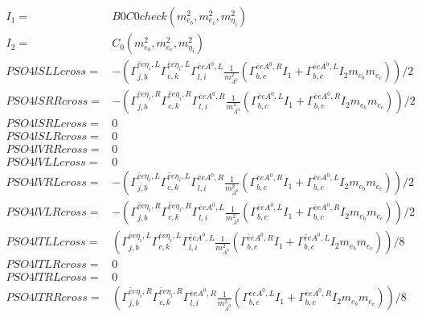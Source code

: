 \documentclass[A4,landscape]{article}
\begin{document}
\begin{align} 
I_1= & B0C0check(m^2_{e_{{b}}}, m^2_{e_{{c}}}, m^2_{\eta_i}) \\ 
I_2= & C_0(m^2_{e_{{b}}}, m^2_{e_{{c}}}, m^2_{\eta_i}) \\ 
  PSO4lSLLcross= & -( \Gamma^{\bar{e}e \eta_i ,L}_{j, b} \Gamma^{\bar{e}e \eta_i ,L}_{c, k} \Gamma^{\bar{e}e A^0 ,L}_{l, i} \frac{1}{m^2_{A^0}} (\Gamma^{\bar{e}e A^0 ,R}_{b, c} I_1 + \Gamma^{\bar{e}e A^0 ,L}_{b, c} I_2 m_{e_{{b}}} m_{e_{{c}}}))/2 \\ 
  PSO4lSRRcross= & -( \Gamma^{\bar{e}e \eta_i ,R}_{j, b} \Gamma^{\bar{e}e \eta_i ,R}_{c, k} \Gamma^{\bar{e}e A^0 ,R}_{l, i} \frac{1}{m^2_{A^0}} (\Gamma^{\bar{e}e A^0 ,L}_{b, c} I_1 + \Gamma^{\bar{e}e A^0 ,R}_{b, c} I_2 m_{e_{{b}}} m_{e_{{c}}}))/2 \\ 
  PSO4lSRLcross= & 0 \\ 
  PSO4lSLRcross= & 0 \\ 
  PSO4lVRRcross= & 0 \\ 
  PSO4lVLLcross= & 0 \\ 
  PSO4lVRLcross= & -( \Gamma^{\bar{e}e \eta_i ,L}_{j, b} \Gamma^{\bar{e}e \eta_i ,L}_{c, k} \Gamma^{\bar{e}e A^0 ,R}_{l, i} \frac{1}{m^2_{A^0}} (\Gamma^{\bar{e}e A^0 ,R}_{b, c} I_1 + \Gamma^{\bar{e}e A^0 ,L}_{b, c} I_2 m_{e_{{b}}} m_{e_{{c}}}))/2 \\ 
  PSO4lVLRcross= & -( \Gamma^{\bar{e}e \eta_i ,R}_{j, b} \Gamma^{\bar{e}e \eta_i ,R}_{c, k} \Gamma^{\bar{e}e A^0 ,L}_{l, i} \frac{1}{m^2_{A^0}} (\Gamma^{\bar{e}e A^0 ,L}_{b, c} I_1 + \Gamma^{\bar{e}e A^0 ,R}_{b, c} I_2 m_{e_{{b}}} m_{e_{{c}}}))/2 \\ 
  PSO4lTLLcross= & ( \Gamma^{\bar{e}e \eta_i ,L}_{j, b} \Gamma^{\bar{e}e \eta_i ,L}_{c, k} \Gamma^{\bar{e}e A^0 ,L}_{l, i} \frac{1}{m^2_{A^0}} (\Gamma^{\bar{e}e A^0 ,R}_{b, c} I_1 + \Gamma^{\bar{e}e A^0 ,L}_{b, c} I_2 m_{e_{{b}}} m_{e_{{c}}}))/8 \\ 
  PSO4lTLRcross= & 0 \\ 
  PSO4lTRLcross= & 0 \\ 
  PSO4lTRRcross= & ( \Gamma^{\bar{e}e \eta_i ,R}_{j, b} \Gamma^{\bar{e}e \eta_i ,R}_{c, k} \Gamma^{\bar{e}e A^0 ,R}_{l, i} \frac{1}{m^2_{A^0}} (\Gamma^{\bar{e}e A^0 ,L}_{b, c} I_1 + \Gamma^{\bar{e}e A^0 ,R}_{b, c} I_2 m_{e_{{b}}} m_{e_{{c}}}))/8 \\ 
\end{align} 
\end{document}

